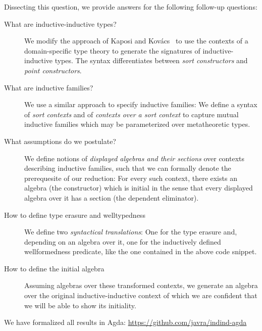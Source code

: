 \documentclass{easychair}
\begin{document}
Dissecting this question, we provide answers for the following follow-up questions:

\begin{description}
\item[What are inductive-inductive types?]
We modify the approach of Kaposi and Kovács~\cite{qiit}
to use the contexts of a domain-specific type theory to generate the signatures
of inductive-inductive types. The syntax differentiates between \emph{sort
constructors} and \emph{point constructors}.
\item[What are inductive families?]
We use a similar approach to specify inductive families:
We define a syntax of \emph{sort contexts} and of \emph{contexts over a sort context}
to capture mutual inductive families which may be parameterized over metatheoretic
types.
\item[What assumptions do we postulate?]
We define notions of \emph{displayed algebras and their sections} over contexts
describing inductive families, such that we can formally denote the prerequesite
of our reduction:
For every such context, there exists an algebra (the constructor) which is initial
in the sense that every displayed algebra over it has a section (the dependent eliminator).
\item[How to define type erasure and welltypedness]
We define two \emph{syntactical translations}: One for the type erasure and,
depending on an algebra over it, one for the inductively defined wellformedness
predicate, like the one contained in the above code snippet.
\item[How to define the initial algebra]
Assuming algebras over these transformed contexts, we generate an algebra over
the original inductive-inductive context of which we are confident that we will
be able to show its initiality.
\end{description}

We have formalized all results in Agda: \url{https://github.com/javra/indind-agda}



\end{document}
